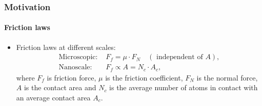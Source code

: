 \documentclass[
	10pt, %
]{beamer}
\begin{document}
\begin{frame}

\end{frame}


\begin{frame}
	\frametitle{Motivation}
	\framesubtitle{Friction laws}

	\begin{itemize}
		\item Friction laws at different scales:
		\begin{align*}
			\text{Microscopic: } &F_f = \mu \cdot F_N \quad (\text{ independent of } A), \\
			\text{Nanoscale: } &F_f \propto A = N_c \cdot A_c,  
		\end{align*}
		where $F_f$ is friction force, $\mu$ is the friction coefficient, $F_N$ is the normal force, $A$ is the contact area and $N_c$ is the average number of atoms in contact with an average contact area $A_c$.
		
		
	\end{itemize}
	
\end{frame}
\end{document}
